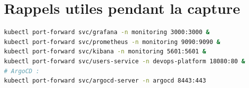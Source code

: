 \documentclass[12pt,a4paper,twoside,openright]{report}
\begin{document}
\section{Rappels utiles pendant la capture}
\begin{lstlisting}[language=bash,caption={Port-forwards typiques pour les UI}]
kubectl port-forward svc/grafana -n monitoring 3000:3000 &
kubectl port-forward svc/prometheus -n monitoring 9090:9090 &
kubectl port-forward svc/kibana -n monitoring 5601:5601 &
kubectl port-forward svc/users-service -n devops-platform 18080:80 &
# ArgoCD :
kubectl port-forward svc/argocd-server -n argocd 8443:443
\end{lstlisting}
\end{document}

